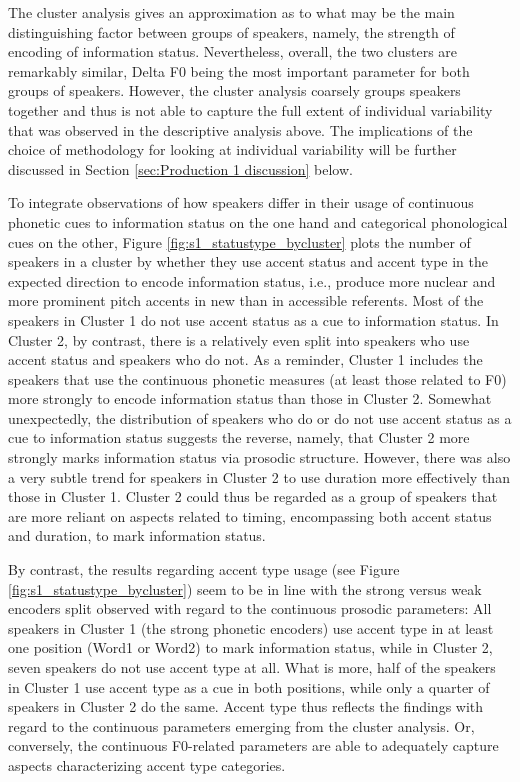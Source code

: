 The cluster analysis gives an approximation as to what may be the main distinguishing factor between groups of speakers, namely, the strength of encoding of information status. Nevertheless, overall, the two clusters are remarkably similar, Delta F0 being the most important parameter for both groups of speakers. However, the cluster analysis coarsely groups speakers together and thus is not able to capture the full extent of individual variability that was observed in the descriptive analysis above. The implications of the choice of methodology for looking at individual variability will be further discussed in Section \ref{sec:Production 1 discussion} below.

To integrate observations of how speakers differ in their usage of continuous phonetic cues to information status on the one hand and categorical phonological cues on the other, Figure \ref{fig:s1_statustype_bycluster} plots the number of speakers in a cluster by whether they use accent status and accent type in the expected direction to encode information status, i.e., produce more nuclear and more prominent pitch accents in new than in accessible referents. Most of the speakers in Cluster 1 do not use accent status as a cue to information status. In Cluster 2, by contrast, there is a relatively even split into speakers who use accent status and speakers who do not. As a reminder, Cluster 1 includes the speakers that use the continuous phonetic measures (at least those related to F0) more strongly to encode information status than those in Cluster 2. Somewhat unexpectedly, the distribution of speakers who do or do not use accent status as a cue to information status suggests the reverse, namely, that Cluster 2 more strongly marks information status via prosodic structure. However, there was also a very subtle trend for speakers in Cluster 2 to use duration more effectively than those in Cluster 1. Cluster 2 could thus be regarded as a group of speakers that are more reliant on aspects related to timing, encompassing both accent status and duration, to mark information status.

By contrast, the results regarding accent type usage (see Figure \ref{fig:s1_statustype_bycluster}) seem to be in line with the strong versus weak encoders split observed with regard to the continuous prosodic parameters: All speakers in Cluster 1 (the strong phonetic encoders) use accent type in at least one position (Word1 or Word2) to mark information status, while in Cluster 2, seven speakers do not use accent type at all. What is more, half of the speakers in Cluster 1 use accent type as a cue in both positions, while only a quarter of speakers in Cluster 2 do the same. Accent type thus reflects the findings with regard to the continuous parameters emerging from the cluster analysis. Or, conversely, the continuous F0-related parameters are able to adequately capture aspects characterizing accent type categories. 

